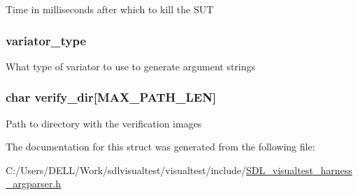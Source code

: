Time in milliseconds after which to kill the S\-U\-T \hypertarget{struct_s_d_l_visual_test___harness_state_aaaa989ae89caee6d39c722cfe6907466}{
\subsubsection[{variator\-\_\-type}]{ variator\-\_\-type}}\label{struct_s_d_l_visual_test___harness_state_aaaa989ae89caee6d39c722cfe6907466}
What type of variator to use to generate argument strings \hypertarget{struct_s_d_l_visual_test___harness_state_adc871112f24f61e2fff74a7a7fb9794f}{
\subsubsection[{verify\-\_\-dir}]{\setlength{\rightskip}{0pt plus 5cm}char verify\-\_\-dir\mbox{[}{\bf M\-A\-X\-\_\-\-P\-A\-T\-H\-\_\-\-L\-E\-N}\mbox{]}}}\label{struct_s_d_l_visual_test___harness_state_adc871112f24f61e2fff74a7a7fb9794f}
Path to directory with the verification images 

The documentation for this struct was generated from the following file\-:\begin{DoxyCompactItemize}
\item 
C\-:/\-Users/\-D\-E\-L\-L/\-Work/sdlvisualtest/visualtest/include/\hyperlink{_s_d_l__visualtest__harness__argparser_8h}{S\-D\-L\-\_\-visualtest\-\_\-harness\-\_\-argparser.\-h}\end{DoxyCompactItemize}
